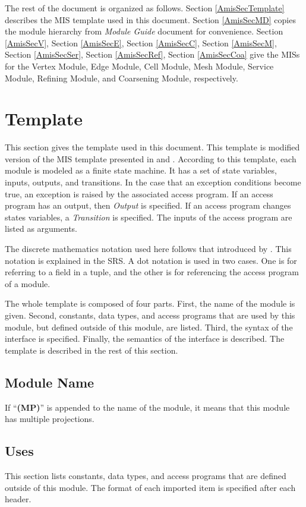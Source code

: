 \documentclass[12pt,titlepage]{article}
\begin{document}
The rest of the document is organized as follows. Section \ref{AmisSecTemplate} describes the MIS template used in this document. Section \ref{AmisSecMD} copies the module hierarchy from \emph{Module Guide} document for convenience. Section \ref{AmisSecV}, Section \ref{AmisSecE}, Section \ref{AmisSecC}, Section \ref{AmisSecM}, Section \ref{AmisSecSer}, Section \ref{AmisSecRef}, Section \ref{AmisSecCoa}  give the MISs for the Vertex Module, Edge Module, Cell Module, Mesh Module, Service Module, Refining Module, and Coarsening Module, respectively. 


\section{Template \label{AmisSecTemplate}}
This section gives the template used in this document. This template is modified version of the MIS template presented in \citet{Ghezzi2003} and \citet{Hoffman1999}. According to this template, each module is modeled as a finite state machine. It has a set of state variables, inputs, outputs, and transitions. In the case that an exception conditions become true, an exception is raised by the associated access program. If an access program has an output, then \emph{Output} is specified. If an access program changes states variables, a \emph{Transition} is specified. The inputs of the access program are listed as arguments. 

The discrete mathematics notation used here follows that introduced by \citet{Gries1993}. This notation is explained in the SRS. A dot notation is used in two cases. One is for referring to a field in a tuple, and the other is for referencing the access program of a module.

The whole template is composed of four parts. First, the name of the module is given. Second, constants, data types, and access programs that are used by this module, but defined outside of this module, are listed. Third, the syntax of the interface is specified. Finally, the semantics of the interface is described. The template is described in the rest of this section. 

\subsection{Module Name}
If ``{\bf (MP)}'' is appended to the name of the module, it means that this module has multiple projections. 
\subsection{Uses}
This section lists constants, data types, and access programs that are defined outside of this module. The format of each imported item is specified after each header. 
\end{document}

